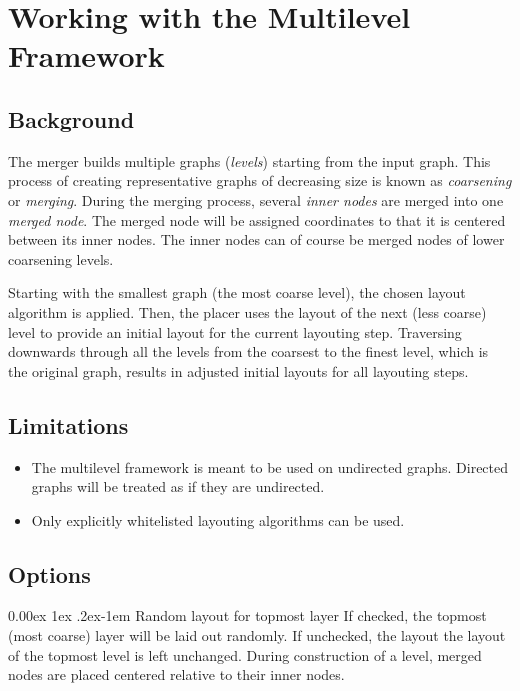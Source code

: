 \documentclass{tufte-handout}
\makeatletter
\renewcommand{\paragraph}{%
  \@startsection{paragraph}{4}%
  {\z@}{0.00ex \@plus 1ex \@minus .2ex}{-1em}%
  {\normalfont\normalsize\bfseries}%
}
\makeatother
\begin{document}
  \section{Working with the Multilevel Framework}

  \subsection{Background}

  The merger builds multiple graphs (\textit{levels}) starting from the input
  graph. This process of creating representative graphs of decreasing size is
  known as \textit{coarsening} or \textit{merging}. During the merging process,
  several \textit{inner nodes} are merged into one \textit{merged node}. The
  merged node will be assigned coordinates to that it is centered between its
  inner nodes. The inner nodes can of course be merged nodes of lower coarsening
  levels.

  Starting with the smallest graph (the most coarse level), the chosen layout
  algorithm is applied. Then, the placer uses the layout of the next (less
  coarse) level to provide an initial layout for the current layouting step.
  Traversing downwards through all the levels from the coarsest to the finest
  level, which is the original graph, results in adjusted initial layouts for
  all layouting steps.

  \subsection{Limitations}
  \begin{itemize}
  \item The multilevel framework is meant to be used on undirected graphs.
    Directed graphs will be treated as if they are undirected.
  \item Only explicitly whitelisted layouting algorithms can be used.
  \end{itemize}

  \subsection{Options}

  \paragraph{Random layout for topmost layer} If checked, the topmost (most
  coarse) layer will be laid out randomly. If unchecked, the layout the layout
  of the topmost level is left unchanged. During construction of a level, merged
  nodes are placed centered relative to their inner nodes.
\end{document}
